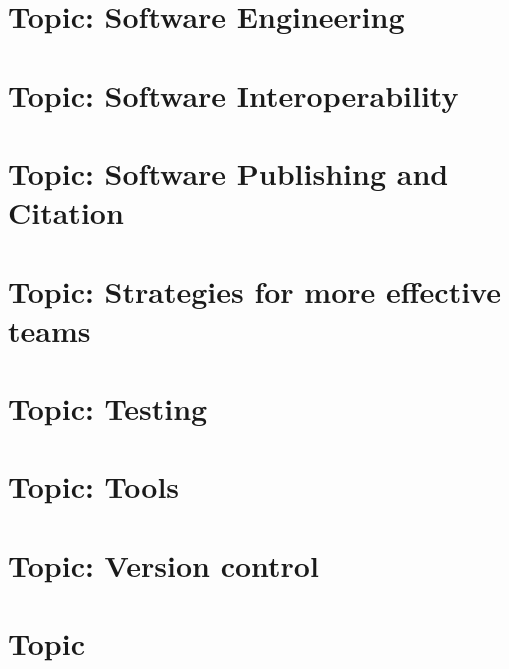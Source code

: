 \documentclass[twoside]{book}
\newcommand{\+}{\discretionary{\mbox{\scriptsize$\hookleftarrow$}}{}{}}
\begin{document}
\chapter{Topic\+: Software Engineering}
\label{md_markdown_topic_software_engineering}

\chapter{Topic\+: Software Interoperability}
\label{md_markdown_topic_software_interoperability}

\chapter{Topic\+: Software Publishing and Citation}
\label{md_markdown_topic_software_publishing_and_citation}

\chapter{Topic\+: Strategies for more effective teams}
\label{md_markdown_topic_stategies_for_more_effective_teams}

\chapter{Topic\+: Testing}
\label{md_markdown_topic_testing}

\chapter{Topic\+: Tools}
\label{md_markdown_topic_tools}

\chapter{Topic\+: Version control}
\label{md_markdown_topic_version_control}

\chapter{Topic}
\label{md_markdown_topics}

\end{document}
